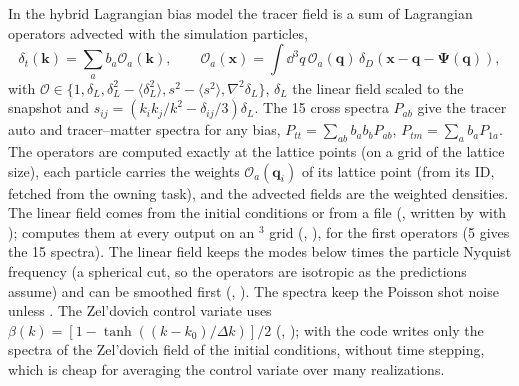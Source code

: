 In the hybrid Lagrangian bias model \cite{Modi2020,Kokron2021,Zennaro2023} the tracer field is a sum of Lagrangian operators advected with the
simulation particles,
\begin{equation}
\delta_t(\bm k)=\sum_ab_a\mathcal O_a(\bm k),\qquad\mathcal O_a(\bm x)=\int\dd^3q\,\mathcal O_a(\bm q)\,\delta_D(\bm x-\bm q-\bm\Psi(\bm q)),
\end{equation}
with $\mathcal O\in\{1,\delta_L,\delta_L^2-\langle\delta_L^2\rangle,s^2-\langle s^2\rangle,\nabla^2\delta_L\}$, $\delta_L$ the linear field scaled to the
snapshot and $s_{ij}=(k_ik_j/k^2-\delta_{ij}/3)\delta_L$. The 15 cross spectra $P_{ab}$ give the tracer auto and tracer--matter spectra for any bias,
$P_{tt}=\sum_{ab}b_ab_bP_{ab}$, $P_{tm}=\sum_ab_aP_{1a}$. The operators are computed exactly at the lattice points (on a grid of the lattice size), each
particle carries the weights $\mathcal O_a(\bm q_i)$ of its lattice point (from its ID, fetched from the owning task), and the advected fields are the
weighted densities. The linear field comes from the initial conditions or from a file (, written by
 with );  computes them at every output on an
$^3$ grid (, ), for the first
 operators (5 gives the 15 spectra). The linear field keeps the modes below
 times the particle Nyquist frequency (a spherical cut, so the operators are isotropic as
the predictions assume) and can be smoothed first (, ).
The spectra keep the Poisson shot noise unless . The Zel'dovich control variate uses
$\beta(k)=[1-\tanh((k-k_0)/\Delta k)]/2$ \cite{Kokron2022} (,
); with  the code writes only the spectra of the
Zel'dovich field of the initial conditions, without time stepping, which is cheap for averaging the control variate over many
realizations.

